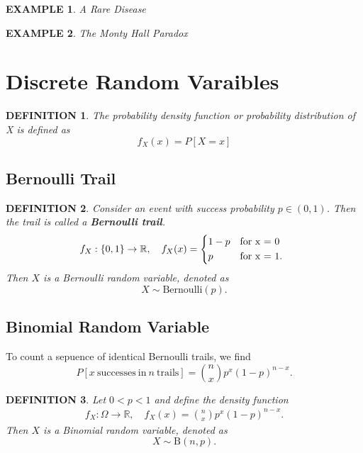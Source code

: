 \documentclass[11pt,a4paper]{article}
\newtheorem*{example}{\bf EXAMPLE}
\newtheorem*{definition}{\bf DEFINITION}
\begin{document}
\begin{example}
    A Rare Disease
\end{example}
\begin{example}
    The Monty Hall Paradox
\end{example}

\section{Discrete Random Varaibles}
\begin{definition}
    The probability density function or probability
    distribution of X is defined as \[f_X(x)=P[X=x]\]
\end{definition}
\subsection{Bernoulli Trail}
\begin{definition}
    Consider an event with success probability $p\in(0,1)$. Then the trail is called
    a {\bf Bernoulli trail}.
    \begin{align}
        f_X:\{0,1\}\rightarrow \mathbb{R}, \quad f_X(x)=\begin{cases*}
                                                            1-p & {\rm for} x = 0  \\
                                                            p   & {\rm for} x = 1.
                                                        \end{cases*}
    \end{align}
    Then $X$ is a Bernoulli random variable, denoted as\[X\sim \mathrm{Bernoulli}(p).\]
\end{definition}

\subsection{Binomial Random Variable}
To count a sepuence of identical Bernoulli trails, we find\[P[x \mathrm{\ successes\ in\ } n \mathrm{\ trails}]=
    \binom{n}{x}p^x(1-p)^{n-x}.\]
\begin{definition}
    Let $0<p<1$ and define the density function
    \begin{align}
        f_X:\varOmega \rightarrow \mathbb{R},
        \quad f_X(x)=\binom{n}{x}p^x(1-p)^{n-x}.
    \end{align}
    Then $X$ is a Binomial random variable, denoted as\[X\sim \mathrm{B}(n,p).\]
\end{definition}
\end{document}
